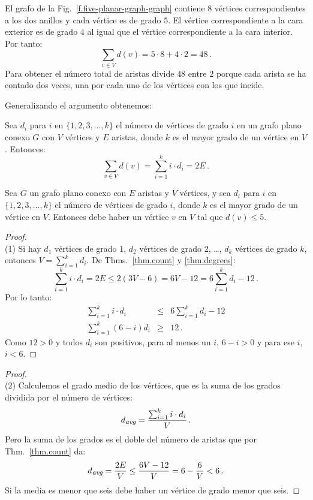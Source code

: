 \begin{example}
El grafo de la Fig.~\ref{f.five-planar-graph-graph} contiene $8$ vértices correspondientes a los dos anillos y cada vértice es de grado $5$. El vértice correspondiente a la cara exterior es de grado $4$ al igual que el vértice correspondiente a la cara interior. Por tanto:
\[
\sum_{v\in V} d(v) = 5\cdot 8 + 4\cdot 2=48\,.
\]
Para obtener el número total de aristas divide $48$ entre $2$ porque cada arista se ha contado dos veces, una por cada uno de los vértices con los que incide.
\end{example}

Generalizando el argumento obtenemos:
\begin{theorem}\label{thm.degrees}
Sea $d_i$ para $i$ en $\{1,2,3,\ldots,k\}$ el número de vértices de grado $i$ en un grafo plano conexo $G$ con $V$ vértices y $E$ aristas, donde $k$ es el mayor grado de un vértice en $V$. Entonces:
\[
\sum_{v\in V} d(v) =\sum_{i=1}^{k} i\cdot d_i=2E\,.
\]
\end{theorem}

\begin{theorem}\label{thm.degree5}
Sea $G$ un grafo plano conexo con $E$ aristas y $V$ vértices, y sea $d_i$ para $i$ en $\{1,2,3,\ldots,k\}$ el número de vértices de grado $i$, donde $k$ es el mayor grado de un vértice en $V$. Entonces debe haber un vértice $v$ en $V$ tal que $d(v) \leq 5$.
\end{theorem}

\begin{proof}
\mbox{}\\
(1)
Si hay $d_1$ vértices de grado $1$, $d_2$ vértices de grado $2$, \ldots, $d_k$ vértices de grado $k$, entonces $V=\sum_{i=1}^{k}d_i$.  De Thms.~\ref{thm.count} y \ref{thm.degrees}:
\[
\sum_{i=1}^{k} i\cdot d_i=2E\leq 2(3V-6) = 6V-12=6\sum_{i=1}^{k} d_i -12\,.
\]
Por lo tanto:
\begin{eqnarray*}
\sum_{i=1}^{k} i\cdot d_i &\leq& 6\sum_{i=1}^{k} d_i -12\\
\sum_{i=1}^{k} (6-i)d_i&\geq& 12\,.
\end{eqnarray*}
Como $12>0$ y todos $d_i$ son positivos, para al menos un $i$, $6-i>0$ y para ese $i$, $i<6$.
\end{proof}

\begin{proof}
\mbox{}\\
(2)
Calculemos el grado medio de los vértices, que es la suma de los grados dividida por el número de vértices:
\[
d_{\textit{\footnotesize avg}}=\frac{\sum_{i=1}^{k} i\cdot d_i}{V}\,.
\]
Pero la suma de los grados es el doble del número de aristas que por Thm.~\ref{thm.count} da:
\[
d_{\textit{\footnotesize avg}}=\frac{2E}{V}\leq \frac{6V-12}{V}=6-\frac{6}{V}<6\,.
\]
Si la media es menor que seis debe haber un vértice de grado menor que seis.
\end{proof}

